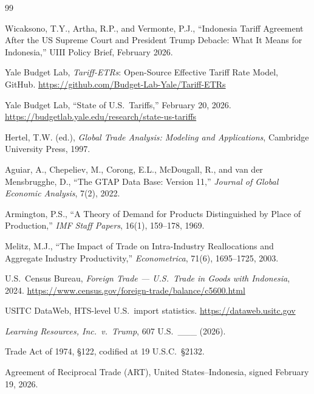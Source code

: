 \documentclass[12pt,a4paper]{article}
\begin{document}
\begin{thebibliography}{99}

Wicaksono, T.Y., Artha, R.P., and Vermonte, P.J., ``Indonesia Tariff Agreement After the US Supreme Court and President Trump Debacle: What It Means for Indonesia,'' UIII Policy Brief, February 2026.

Yale Budget Lab, \textit{Tariff-ETRs}: Open-Source Effective Tariff Rate Model, GitHub.
\url{https://github.com/Budget-Lab-Yale/Tariff-ETRs}

Yale Budget Lab, ``State of U.S.\ Tariffs,'' February 20, 2026.
\url{https://budgetlab.yale.edu/research/state-us-tariffs}

Hertel, T.W. (ed.), \textit{Global Trade Analysis: Modeling and Applications}, Cambridge University Press, 1997.

Aguiar, A., Chepeliev, M., Corong, E.L., McDougall, R., and van der Mensbrugghe, D., ``The GTAP Data Base: Version 11,'' \textit{Journal of Global Economic Analysis}, 7(2), 2022.

Armington, P.S., ``A Theory of Demand for Products Distinguished by Place of Production,'' \textit{IMF Staff Papers}, 16(1), 159--178, 1969.

Melitz, M.J., ``The Impact of Trade on Intra-Industry Reallocations and Aggregate Industry Productivity,'' \textit{Econometrica}, 71(6), 1695--1725, 2003.

U.S.\ Census Bureau, \textit{Foreign Trade --- U.S.\ Trade in Goods with Indonesia}, 2024.
\url{https://www.census.gov/foreign-trade/balance/c5600.html}

USITC DataWeb, HTS-level U.S.\ import statistics.
\url{https://dataweb.usitc.gov}

\textit{Learning Resources, Inc.\ v.\ Trump}, 607 U.S.\ \_\_\_ (2026).

Trade Act of 1974, \S 122, codified at 19 U.S.C.\ \S 2132.

Agreement of Reciprocal Trade (ART), United States--Indonesia, signed February 19, 2026.

\end{thebibliography}
\end{document}
